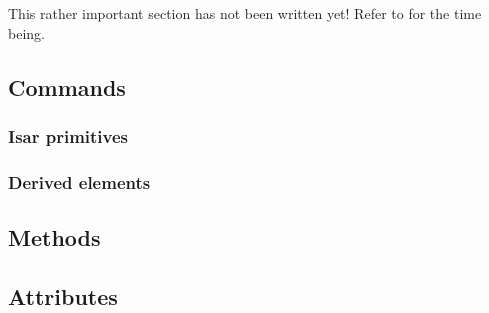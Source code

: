 This rather important section has not been written yet!  Refer to
\cite{Wenzel:1999:TPHOL} for the time being.

\subsection{Commands}

\subsubsection{Isar primitives}

\subsubsection{Derived elements}


\subsection{Methods}

\subsection{Attributes}



